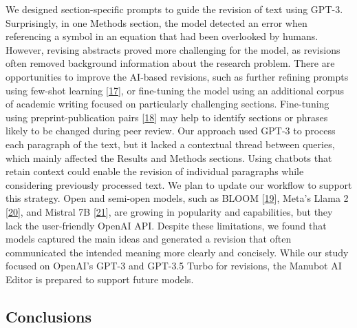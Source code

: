 \documentclass[
]{article}
\begin{document}
We designed section-specific prompts to guide the revision of text using GPT-3.
Surprisingly, in one Methods section, the model detected an error when referencing a symbol in an equation that had been overlooked by humans.
However, revising abstracts proved more challenging for the model, as revisions often removed background information about the research problem.
There are opportunities to improve the AI-based revisions, such as further refining prompts using few-shot learning {[}\protect\hyperlink{ref-S1Lim9f9}{17}{]}, or fine-tuning the model using an additional corpus of academic writing focused on particularly challenging sections.
Fine-tuning using preprint-publication pairs {[}\protect\hyperlink{ref-WVt383GU}{18}{]} may help to identify sections or phrases likely to be changed during peer review.
Our approach used GPT-3 to process each paragraph of the text, but it lacked a contextual thread between queries, which mainly affected the Results and Methods sections.
Using chatbots that retain context could enable the revision of individual paragraphs while considering previously processed text.
We plan to update our workflow to support this strategy.
Open and semi-open models, such as BLOOM {[}\protect\hyperlink{ref-I4d1F0yv}{19}{]}, Meta's Llama 2 {[}\protect\hyperlink{ref-A213xAuD}{20}{]}, and Mistral 7B {[}\protect\hyperlink{ref-1wOalSCp}{21}{]}, are growing in popularity and capabilities, but they lack the user-friendly OpenAI API.
Despite these limitations, we found that models captured the main ideas and generated a revision that often communicated the intended meaning more clearly and concisely.
While our study focused on OpenAI's GPT-3 and GPT-3.5 Turbo for revisions, the Manubot AI Editor is prepared to support future models.

\subsection{Conclusions}
\end{document}
